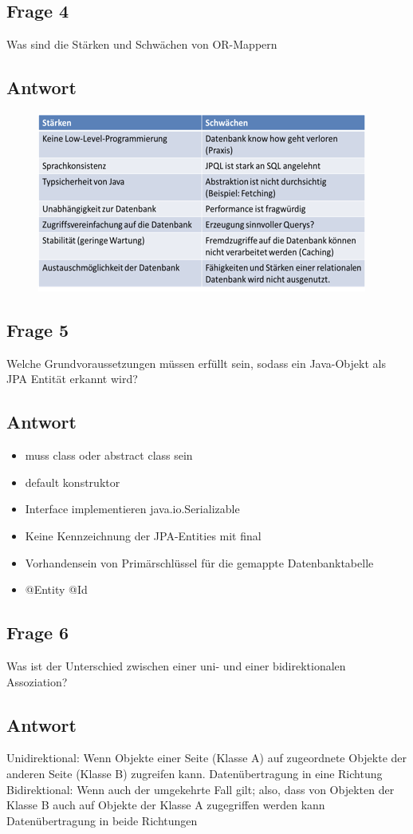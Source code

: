 \subsection*{Frage 4}
Was sind die Stärken und Schwächen von OR-Mappern
\subsection*{Antwort}
\begin{figure}
		\centering
		\includegraphics[width=0.7\linewidth]{screenshot001}
		\caption{}
		\label{fig:screenshot001}
	\end{figure}
\subsection*{Frage 5}
Welche Grundvoraussetzungen müssen erfüllt sein, sodass ein Java-Objekt als JPA Entität erkannt wird?
\subsection*{Antwort}
\begin{itemize}
	\item muss class oder abstract class sein
	\item default konstruktor
	\item Interface implementieren java.io.Serializable
	\item Keine Kennzeichnung der JPA-Entities mit final
	\item Vorhandensein von Primärschlüssel für die gemappte Datenbanktabelle 
	\item @Entity @Id
\end{itemize}
\subsection*{Frage 6}
Was ist der Unterschied zwischen einer uni- und einer bidirektionalen Assoziation?
\subsection*{Antwort}
Unidirektional: Wenn Objekte einer Seite (Klasse A) auf zugeordnete Objekte der anderen Seite (Klasse B) zugreifen kann.  Datenübertragung in eine Richtung
Bidirektional: Wenn auch der umgekehrte Fall gilt; also, dass von Objekten der Klasse B auch auf Objekte der Klasse A zugegriffen werden kann  Datenübertragung in beide Richtungen

